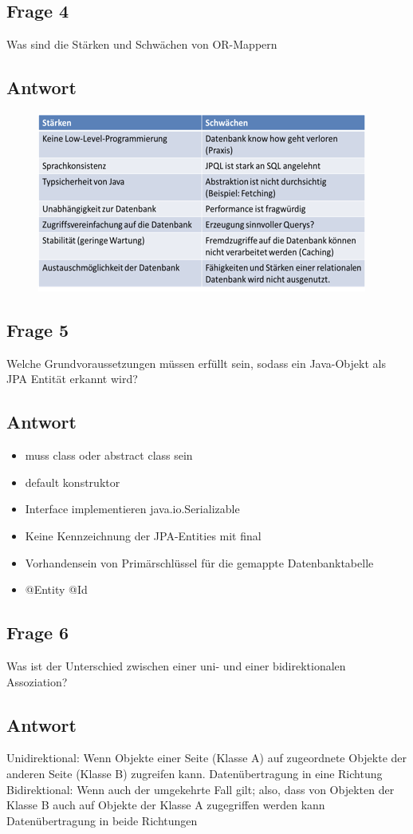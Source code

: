 \subsection*{Frage 4}
Was sind die Stärken und Schwächen von OR-Mappern
\subsection*{Antwort}
\begin{figure}
		\centering
		\includegraphics[width=0.7\linewidth]{screenshot001}
		\caption{}
		\label{fig:screenshot001}
	\end{figure}
\subsection*{Frage 5}
Welche Grundvoraussetzungen müssen erfüllt sein, sodass ein Java-Objekt als JPA Entität erkannt wird?
\subsection*{Antwort}
\begin{itemize}
	\item muss class oder abstract class sein
	\item default konstruktor
	\item Interface implementieren java.io.Serializable
	\item Keine Kennzeichnung der JPA-Entities mit final
	\item Vorhandensein von Primärschlüssel für die gemappte Datenbanktabelle 
	\item @Entity @Id
\end{itemize}
\subsection*{Frage 6}
Was ist der Unterschied zwischen einer uni- und einer bidirektionalen Assoziation?
\subsection*{Antwort}
Unidirektional: Wenn Objekte einer Seite (Klasse A) auf zugeordnete Objekte der anderen Seite (Klasse B) zugreifen kann.  Datenübertragung in eine Richtung
Bidirektional: Wenn auch der umgekehrte Fall gilt; also, dass von Objekten der Klasse B auch auf Objekte der Klasse A zugegriffen werden kann  Datenübertragung in beide Richtungen

